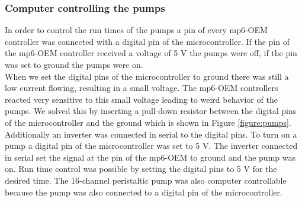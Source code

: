 \subsubsection{Computer controlling the pumps}
In order to control the run times of the pumps a pin of every mp6-OEM controller was connected with a digital pin of the microcontroller. If the pin of the mp6-OEM controller received a voltage of 5 V the pumps were off, if the pin was set to ground the pumps were on. \\
When we set the digital pins of the microcontroller to ground there was still a low current flowing, resulting in a small voltage. The mp6-OEM controllers reacted very sensitive to this small voltage leading to weird behavior of the pumps. We solved this by inserting a pull-down resistor between the digital pins of the microcontroller and the ground which is shown in Figure \ref{figure:pumps}. Additionally an inverter was connected in serial to the digital pins. To turn on a pump a digital pin of the microcontroller was set to 5 V. The inverter connected in serial set the signal at the pin of the mp6-OEM to ground and the pump was on. Run time control was possible by setting the digital pins to 5 V for the desired time.
The 16-channel peristaltic pump was also computer controllable because the pump was also connected to a digital pin of the microcontroller.
\label{section:pumps}

